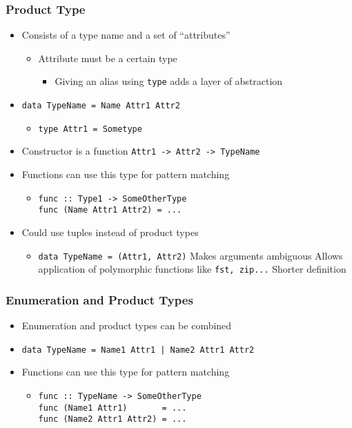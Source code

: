 \subsubsection{Product Type}
\begin{itemize}
    \item Consists of a type name and a set of ``attributes''
        \begin{itemize}
            \item Attribute must be a certain type
                \begin{itemize}
                    \item Giving an alias using \verb+type+ adds a layer of abstraction
                \end{itemize}
        \end{itemize}
    \item \verb+data TypeName = Name Attr1 Attr2+
        \begin{itemize}
            \item \verb+type Attr1 = Sometype+
        \end{itemize}
    \item Constructor is a function \verb+Attr1 -> Attr2 -> TypeName+
    \item Functions can use this type for pattern matching
        \begin{itemize}
            \item
\begin{verbatim}
func :: Type1 -> SomeOtherType
func (Name Attr1 Attr2) = ...
\end{verbatim}
        \end{itemize}
    \item Could use tuples instead of product types
        \begin{itemize}
            \item \verb+data TypeName = (Attr1, Attr2)+
            \icon Makes arguments ambiguous
            \ipro Allows application of polymorphic functions like \verb+fst, zip...+
            \ipro Shorter definition
        \end{itemize}
\end{itemize}

\subsubsection{Enumeration and Product Types}
\begin{itemize}
    \item Enumeration and product types can be combined
    \item \verb+data TypeName = Name1 Attr1 | Name2 Attr1 Attr2+
    \item Functions can use this type for pattern matching
        \begin{itemize}
            \item
\begin{verbatim}
func :: TypeName -> SomeOtherType
func (Name1 Attr1)       = ...
func (Name2 Attr1 Attr2) = ...
\end{verbatim}
        \end{itemize}
\end{itemize}

